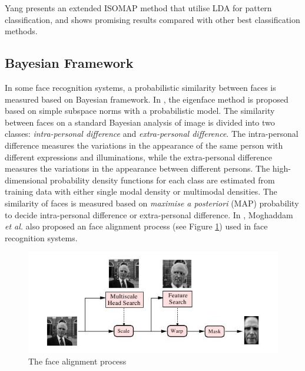 Yang \cite{Yang2002ICIP} presents an extended ISOMAP method that utilise LDA for pattern classification, and shows promising results compared with other best classification methods.

\subsection{Bayesian Framework}
In some face recognition systems, a probabilistic similarity between faces is measured based on Bayesian framework. In \cite{Moghaddam1997, Moghaddam2000}, the eigenface method is proposed based on simple subspace norms with a probabilistic model. The similarity between faces on a standard Bayesian analysis of image is divided into two classes: \textit{intra-personal difference} and \textit{extra-personal difference}. The intra-personal difference measures the variations in the appearance of the same person with different expressions and illuminations, while the extra-personal difference measures the variations in the appearance between different persons. The high-dimensional probability density functions for each class are estimated from training data with either single modal density or multimodal densities. The similarity of faces is measured based on \textit{maximise a posteriori }(MAP) probability to decide intra-personal difference or extra-personal difference. In \cite{Moghaddam2000}, Moghaddam \textit{et al.} also proposed an face alignment process (see \mbox{Figure} \ref{fig:facealign}) used in face recognition systems.
\begin{figure}[ht]
 \begin{center}
  \includegraphics[width=\columnwidth]{ch2/figures/facealignsystem.jpg}
  \caption{The face alignment process \cite{Moghaddam2000}}
  \label{fig:facealign}
 \end{center}
\end{figure} 
